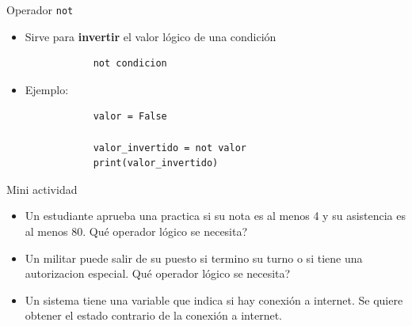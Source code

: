 \documentclass{beamer}
\begin{document}
    \begin{frame}[fragile,t]{Operador \texttt{not}}
        \begin{itemize}
            \item Sirve para \textbf{invertir} el valor lógico de una condición
            \begin{verbatim}
            not condicion
            \end{verbatim}
            \item Ejemplo:
            \begin{verbatim}
            valor = False

            valor_invertido = not valor
            print(valor_invertido)
            \end{verbatim}
        \end{itemize}
    \end{frame}

    \begin{frame}{Mini actividad}
        \begin{itemize}
            \item Un estudiante aprueba una practica si su nota es al menos 4 y su asistencia es al menos 80.
            Qué operador lógico se necesita?
            \item Un militar puede salir de su puesto si termino su turno o si tiene una autorizacion especial. 
            Qué operador lógico se necesita?
            \item Un sistema tiene una variable que indica si hay conexión a internet.
            Se quiere obtener el estado contrario de la conexión a internet.
        \end{itemize}
    \end{frame}
\end{document}
